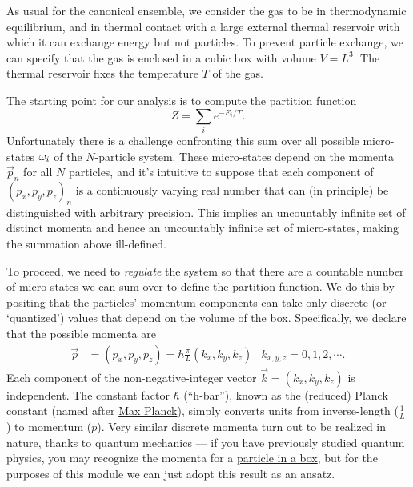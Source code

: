 As usual for the canonical ensemble, we consider the gas to be in thermodynamic equilibrium, and in thermal contact with a large external thermal reservoir with which it can exchange energy but not particles.
To prevent particle exchange, we can specify that the gas is enclosed in a cubic box with volume $V = L^3$.
The thermal reservoir fixes the temperature $T$ of the gas.

The starting point for our analysis is to compute the partition function
\begin{equation*}
  Z = \sum_i e^{-E_i / T}.
\end{equation*}
Unfortunately there is a challenge confronting this sum over all possible micro-states $\omega_i$ of the $N$-particle system.
These micro-states depend on the momenta $\vec{p}_n$ for all $N$ particles, and it's intuitive to suppose that each component of $(p_x, p_y, p_z)_n$ is a continuously varying real number that can (in principle) be distinguished with arbitrary precision.
This implies an uncountably infinite set of distinct momenta and hence an uncountably infinite set of micro-states, making the summation above ill-defined.

To proceed, we need to \textit{regulate} the system so that there are a countable number of micro-states we can sum over to define the partition function.
We do this by positing that the particles' momentum components can take only discrete (or `quantized') values that depend on the volume of the box.
Specifically, we declare that the possible momenta are
\begin{align}
  \label{eq:quant_mom}
  \vec p & = (p_x, p_y, p_z) = \hbar \frac{\pi}{L} (k_x, k_y, k_z) &
  k_{x, y, z} = 0, 1, 2, \cdots.
\end{align}
Each component of the non-negative-integer vector $\vec k = (k_x, k_y, k_z)$ is independent.
The constant factor $\hbar$ (``h-bar''), known as the (reduced) Planck constant (named after \href{https://en.wikipedia.org/wiki/Max_Planck}{Max Planck}), simply converts units from inverse-length ($\frac{1}{L}$) to momentum ($p$).
Very similar discrete momenta turn out to be realized in nature, thanks to quantum mechanics --- if you have previously studied quantum physics, you may recognize the momenta for a \href{https://en.wikipedia.org/wiki/Particle_in_a_box}{particle in a box}, but for the purposes of this module we can just adopt this result as an ansatz. %

